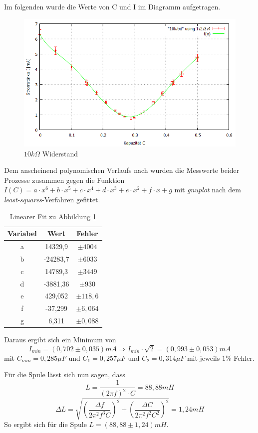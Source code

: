 Im folgenden wurde die Werte von C und I im Diagramm aufgetragen.
\begin{figure}[h]
  \centering
  \includegraphics[width=.9\textwidth]{10k.png}
  \caption{$10k\Omega$ Widerstand}
  \label{fig:10k}
\end{figure}

Dem anscheinend polynomischen Verlaufs nach wurden die Messwerte beider Prozesse zusammen gegen die Funktion $I(C)=a\cdot x^6+b\cdot x^5+c\cdot x^4+d\cdot x^3+e\cdot x^2+f\cdot x+g$ mit \emph{gnuplot} nach dem \emph{least-squares}-Verfahren gefittet.
\begin{table}[H]
  \centering
  \begin{tabular}{c | c | c }
    Variabel & Wert & Fehler\\ \hline
    a  & 14329,9 & $\pm 4004$\\
    b & -24283,7 & $\pm6033$\\
    c  & 14789,3 & $\pm 3449$\\
    d  & -3881,36 & $\pm 930$\\
    e  & 429,052 & $\pm 118,6$\\
    f  & -37,299 & $\pm 6,064$\\
    g  & 6,311 & $\pm 0,088$\\
  \end{tabular}
  \caption{Linearer Fit zu Abbildung \ref{fig:10k}}
  \label{tab:fit10k}
\end{table}

Daraus ergibt sich ein Minimum von
\begin{equation}
I_{min}=(0,702\pm 0,035)mA \Rightarrow I_{min}\cdot \sqrt{2}=(0,993\pm0,053)mA
\end{equation}
mit $C_{min}=0,285 \mu F$ und $C_{1}=0,257 \mu F$ und $C_{2}=0,314 \mu F$ mit jeweils $1\%$ Fehler.

Für die Spule lässt sich nun sagen, dass
\begin{equation}
L=\frac{1}{(2\pi f)^2\cdot C}=88,88mH
\end{equation}
\begin{equation}
\Delta L =\sqrt{(\frac{\Delta f}{2\pi^2 f^3 C})^2+(\frac{\Delta C}{2\pi^2 f^2 C^2})^2}=1,24mH
\end{equation}
So ergibt sich für die Spule $L=(88,88 \pm 1,24)mH$.

